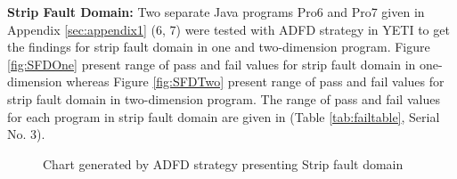 \documentclass[runningheads,a4paper]{llncs}
\begin{document}



\noindent \textbf{Strip Fault Domain:} Two separate Java programs Pro6 and Pro7 given in Appendix \ref{sec:appendix1} (6, 7) were tested with ADFD strategy in YETI to get the findings for strip fault domain in one and two-dimension program. Figure \ref{fig:SFDOne} present range of pass and fail values for strip fault domain in one-dimension whereas Figure \ref{fig:SFDTwo} present range of pass and fail values for strip fault domain in two-dimension program. The range of pass and fail values for each program in strip fault domain are given in (Table \ref{tab:failtable}, Serial No. 3).


%
\begin{figure} [H]



\caption{Chart generated by ADFD strategy presenting Strip fault domain}
\end{figure}






\end{document}
